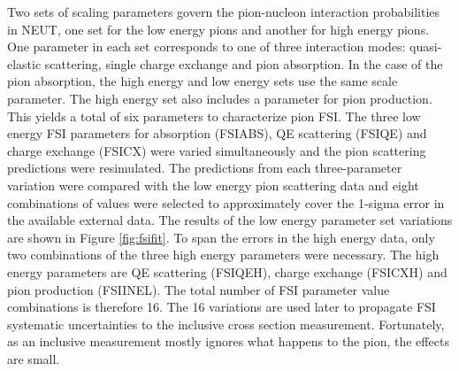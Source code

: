 Two sets of scaling parameters govern the pion-nucleon interaction probabilities in NEUT, one set for the low energy pions and another for high energy pions. One parameter in each set corresponds to one of three interaction modes: quasi-elastic scattering, single charge exchange and pion absorption. In the case of the pion absorption, the high energy and low energy sets use the same scale parameter. The high energy set also includes a parameter for pion production. This yields a total of six parameters to characterize pion FSI. The three low energy FSI parameters for absorption (FSIABS), QE scattering (FSIQE) and charge exchange (FSICX) were varied simultaneously and the pion scattering predictions were resimulated. The predictions from each three-parameter variation were compared with the low energy pion scattering data and eight combinations of values were selected to approximately cover the 1-sigma error in the available external data. The results of the low energy parameter set variations are shown in Figure \ref{fig:fsifit}. To span the errors in the high energy data, only two combinations of the three high energy parameters were necessary. The high energy parameters are QE scattering (FSIQEH), charge exchange (FSICXH) and pion production (FSIINEL). The total number of FSI parameter value combinations is therefore 16. The 16 variations are used later to propagate FSI systematic uncertainties to the inclusive cross section measurement. Fortunately, as an inclusive measurement mostly ignores what happens to the pion, the effects are small.
